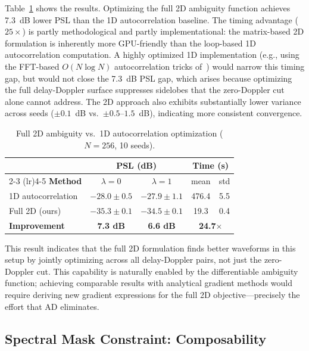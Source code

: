 \documentclass[journal]{IEEEtran}
\begin{document}
Table~\ref{tab:baseline} shows the results.
Optimizing the full 2D ambiguity function achieves 7.3~dB lower PSL than the 1D autocorrelation baseline.
The timing advantage ($25\times$) is partly methodological and partly implementational: the matrix-based 2D formulation is inherently more GPU-friendly than the loop-based 1D autocorrelation computation.
A highly optimized 1D implementation (e.g., using the FFT-based $O(N\log N)$ autocorrelation tricks of~\cite{song2015optimization}) would narrow this timing gap, but would not close the 7.3~dB PSL gap, which arises because optimizing the full delay-Doppler surface suppresses sidelobes that the zero-Doppler cut alone cannot address.
The 2D approach also exhibits substantially lower variance across seeds ($\pm 0.1$~dB vs.\ $\pm 0.5$--$1.5$~dB), indicating more consistent convergence.

\begin{table}[!htbp]
\centering
\caption{Full 2D ambiguity vs.\ 1D autocorrelation optimization ($N=256$, 10 seeds).}
\label{tab:baseline}
\renewcommand{\arraystretch}{1.1}
\begin{tabular}{@{}lcccc@{}}
\toprule
 & \multicolumn{2}{c}{\textbf{PSL (dB)}} & \multicolumn{2}{c}{\textbf{Time (s)}} \\
\cmidrule(lr){2-3} \cmidrule(lr){4-5}
\textbf{Method} & $\lambda{=}0$ & $\lambda{=}1$ & mean & std \\
\midrule
1D autocorrelation & $-28.0{\pm}0.5$ & $-27.9{\pm}1.1$ & 476.4 & 5.5 \\
Full 2D (ours)     & $-35.3{\pm}0.1$ & $-34.5{\pm}0.1$ & 19.3  & 0.4 \\
\midrule
\textbf{Improvement} & \textbf{7.3 dB} & \textbf{6.6 dB} & \multicolumn{2}{c}{\textbf{24.7$\times$}} \\
\bottomrule
\end{tabular}
\end{table}

This result indicates that the full 2D formulation finds better waveforms in this setup by jointly optimizing across all delay-Doppler pairs, not just the zero-Doppler cut.
This capability is naturally enabled by the differentiable ambiguity function; achieving comparable results with analytical gradient methods would require deriving new gradient expressions for the full 2D objective---precisely the effort that AD eliminates.

\subsection{Spectral Mask Constraint: Composability}
\end{document}
